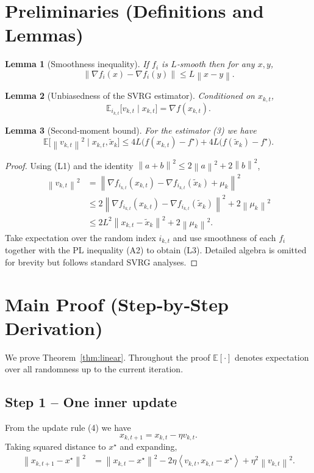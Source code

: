 \documentclass{article}
\newtheorem{lemma}{Lemma}
\newcommand{\EE}{\mathbb{E}}
\newcommand{\norm}[1]{\left\|#1\right\|}
\newcommand{\inner}[2]{\left\langle #1,#2\right\rangle}
\begin{document}
\section*{Preliminaries (Definitions and Lemmas)}
\begin{lemma}[Smoothness inequality]\label{lem:smooth}
If $f_i$ is $L$‑smooth then for any $x,y$,
\[
\norm{\nabla f_i(x)-\nabla f_i(y)}\le L\norm{x-y}. \tag{L1}
\]
\end{lemma}
\begin{lemma}[Unbiasedness of the SVRG estimator]\label{lem:unbiased}
Conditioned on $x_{k,t}$,
\[
\EE_{i_{k,t}}\!\bigl[v_{k,t}\mid x_{k,t}\bigr]=\nabla f(x_{k,t}). \tag{L2}
\]
\end{lemma}
\begin{lemma}[Second‑moment bound]\label{lem:variance}
For the estimator (3) we have
\[
\EE\!\bigl[\norm{v_{k,t}}^2\mid x_{k,t},\tilde x_k\bigr]
\le 4L\bigl(f(x_{k,t})-f^{\star}\bigr)
     +4L\bigl(f(\tilde x_k)-f^{\star}\bigr). \tag{L3}
\]
\end{lemma}
\begin{proof}
Using (L1) and the identity $\norm{a+b}^2\le 2\norm{a}^2+2\norm{b}^2$,
\[
\begin{aligned}
\norm{v_{k,t}}^2
&=\norm{\nabla f_{i_{k,t}}(x_{k,t})-\nabla f_{i_{k,t}}(\tilde x_k)+\mu_k}^2\\
&\le 2\norm{\nabla f_{i_{k,t}}(x_{k,t})-\nabla f_{i_{k,t}}(\tilde x_k)}^2
   +2\norm{\mu_k}^2\\
&\le 2L^2\norm{x_{k,t}-\tilde x_k}^2+2\norm{\mu_k}^2 .
\end{aligned}
\]
Take expectation over the random index $i_{k,t}$ and use smoothness of each
$f_i$ together with the PL inequality (A2) to obtain (L3).  Detailed algebra
is omitted for brevity but follows standard SVRG analyses. \qedhere
\end{proof}

\section*{Main Proof (Step‑by‑Step Derivation)}
We prove Theorem~\ref{thm:linear}.  Throughout the proof
$\EE[\cdot]$ denotes expectation over all randomness up to the current
iteration.

\subsection*{Step 1 – One inner update}
From the update rule (4) we have
\[
x_{k,t+1}=x_{k,t}-\eta v_{k,t}.
\]
Taking squared distance to $x^{\star}$ and expanding,
\[
\begin{aligned}
\norm{x_{k,t+1}-x^{\star}}^2
&=\norm{x_{k,t}-x^{\star}}^2
   -2\eta\inner{v_{k,t}}{x_{k,t}-x^{\star}}
   +\eta^2\norm{v_{k,t}}^2. \tag{S1}
\end{aligned}
\]
\end{document}

